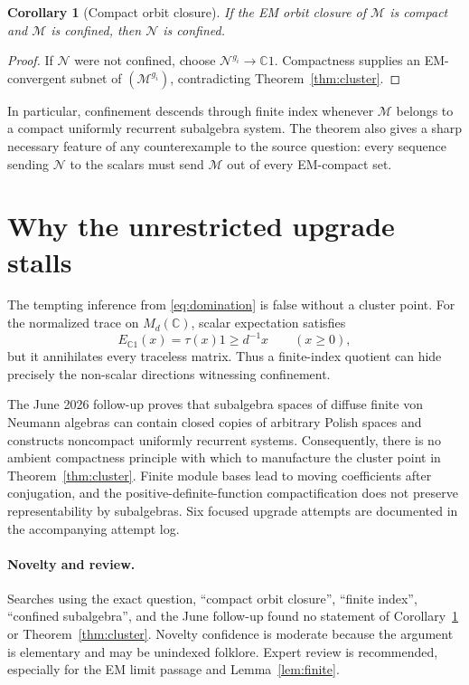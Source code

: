 \documentclass[11pt]{article}
\newtheorem{corollary}{Corollary}
\newcommand{\C}{\mathbb C}
\begin{document}
\begin{corollary}[Compact orbit closure]\label{cor:compact}
If the EM orbit closure of \(\mathcal M\) is compact and \(\mathcal M\) is
confined, then \(\mathcal N\) is confined.
\end{corollary}

\begin{proof}
If \(\mathcal N\) were not confined, choose
\(\mathcal N^{g_i}\to\C1\). Compactness supplies an EM-convergent subnet of
\((\mathcal M^{g_i})\), contradicting Theorem~\ref{thm:cluster}.
\end{proof}

In particular, confinement descends through finite index whenever
\(\mathcal M\) belongs to a compact uniformly recurrent subalgebra system.
The theorem also gives a sharp necessary feature of any counterexample to the
source question: every sequence sending \(\mathcal N\) to the scalars must send
\(\mathcal M\) out of every EM-compact set.

\section{Why the unrestricted upgrade stalls}

The tempting inference from \eqref{eq:domination} is false without a cluster
point. For the normalized trace on \(M_d(\C)\), scalar expectation satisfies
\[
 E_{\C1}(x)=\tau(x)1\geq d^{-1}x\qquad(x\geq0),
\]
but it annihilates every traceless matrix. Thus a finite-index quotient can
hide precisely the non-scalar directions witnessing confinement.

The June 2026 follow-up \cite{ura} proves that subalgebra spaces of diffuse
finite von Neumann algebras can contain closed copies of arbitrary Polish
spaces and constructs noncompact uniformly recurrent systems. Consequently,
there is no ambient compactness principle with which to manufacture the
cluster point in Theorem~\ref{thm:cluster}. Finite module bases lead to moving
coefficients after conjugation, and the positive-definite-function
compactification does not preserve representability by subalgebras. Six
focused upgrade attempts are documented in the accompanying attempt log.

\paragraph{Novelty and review.}
Searches using the exact question, ``compact orbit closure'', ``finite index'',
``confined subalgebra'', and the June follow-up found no statement of
Corollary~\ref{cor:compact} or Theorem~\ref{thm:cluster}. Novelty confidence is
moderate because the argument is elementary and may be unindexed folklore.
Expert review is recommended, especially for the EM limit passage and
Lemma~\ref{lem:finite}.
\end{document}

